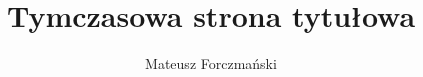 \documentclass[a4paper]{book}
\title{Tymczasowa strona tytułowa}
\author{Mateusz Forczmański}
\begin{document}



\mainmatter









\nocite{*}
\printbibliography

\end{document}
